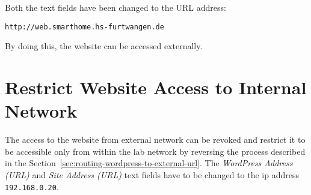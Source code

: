 Both the text fields have been changed to the URL address:
\begin{lstlisting}
http://web.smarthome.hs-furtwangen.de
\end{lstlisting}

By doing this, the website can be accessed externally.

\section{Restrict Website Access to Internal Network}
The access to the website from external network can be revoked and restrict it to be accessible only from within the lab network by reversing the process described in the Section~\ref{sec:routing-wordpress-to-external-url}. The \emph{WordPress Address (URL)} and \emph{Site Address (URL)} text fields have to be changed to the \ac{ip} address \texttt{192.168.0.20}.


